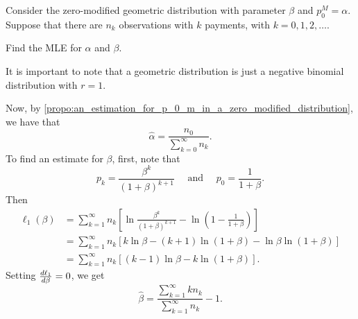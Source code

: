 \documentclass[notoc,notitlepage]{tufte-book}
\begin{document}
\begin{eg}
  Consider the zero-modified geometric distribution
  with parameter $\beta$ and $p_0^M = \alpha$.
  Suppose that there are $n_k$ observations with $k$ payments,
  with $k = 0, 1, 2, \ldots$.

  Find the MLE for $\alpha$ and $\beta$.
\end{eg}

\begin{solution}
  It is important to note that a geometric distribution is just
  a negative binomial distribution with $r = 1$.

  Now, by \cref{propo:an_estimation_for_p_0_m_in_a_zero_modified_distribution},
  we have that
  \begin{equation*}
    \hat{\alpha} = \frac{n_0}{ \sum_{k=0}^{\infty} n_k }.
  \end{equation*}
  To find an estimate for $\beta$, first, note that
  \begin{equation*}
    p_k = \frac{\beta^k}{(1 + \beta)^{k+1}} \quad\text{ and }\quad
    p_0 = \frac{1}{1 + \beta}.
  \end{equation*}
  Then
  \begin{align*}
    \ell_1(\beta)
    &= \sum_{k=1}^{\infty} n_k \left[ \ln \frac{\beta^k}{(1 + \beta)^{k+1}} 
      - \ln \left( 1 - \frac{1}{1 + \beta} \right)
    \right] \\
    &= \sum_{k=1}^{\infty} n_k [ k \ln \beta - (k+1) \ln (1 + \beta)
      - \ln \beta \ln (1 + \beta) ] \\
    &= \sum_{k=1}^{\infty} n_k [ (k-1) \ln \beta - k \ln (1 + \beta) ].
  \end{align*}
  Setting $\frac{\mathop{}\!d{\ell_1}}{\mathop{}\!d{\beta}} = 0$, we get
  \begin{equation*}
    \hat{\beta} = \frac{ \sum_{k=1}^{\infty} kn_k }{ \sum_{k=1}^{\infty} n_k } -
    1.
  \end{equation*}
\end{solution}




\appendix

\backmatter

\fancyhead[LE]{\thepage \enspace \textsl{\leftmark}}



\printindex
\end{document}
